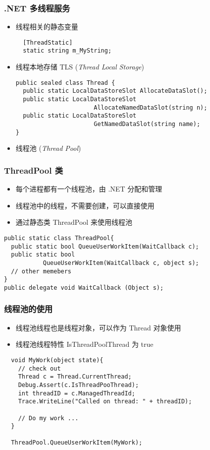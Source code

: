 \begin{frame}[fragile]
\frametitle{.NET 多线程服务}
\begin{itemize}
\item 线程相关的静态变量
\begin{lstlisting}
  [ThreadStatic]
  static string m_MyString;
\end{lstlisting}
\item 线程本地存储 TLS (\textit{Thread Local Storage})
\begin{lstlisting}
public sealed class Thread {
  public static LocalDataStoreSlot AllocateDataSlot();
  public static LocalDataStoreSlot 
                      AllocateNamedDataSlot(string n);
  public static LocalDataStoreSlot
                      GetNamedDataSlot(string name);
}
\end{lstlisting}
\item 线程池 (\textit{Thread Pool})
\end{itemize}
\end{frame}

\begin{frame}[fragile]
\frametitle{ThreadPool 类}
\begin{itemize}
\item 每个进程都有一个线程池，由 .NET 分配和管理
\item 线程池中的线程，不需要创建，可以直接使用
\item 通过静态类 ThreadPool 来使用线程池
\end{itemize}
\begin{lstlisting}
public static class ThreadPool{
  public static bool QueueUserWorkItem(WaitCallback c);
  public static bool
           QueueUserWorkItem(WaitCallback c, object s);
  // other memebers
}
public delegate void WaitCallback (Object s);
\end{lstlisting}
\end{frame}

\begin{frame}[fragile]
\frametitle{线程池的使用}
\begin{itemize}
\item 线程池线程也是线程对象，可以作为 Thread 对象使用
\item 线程池线程特性 IsThreadPoolThread 为 true
\end{itemize}
\begin{lstlisting}
  void MyWork(object state){
    // check out
    Thread c = Thread.CurrentThread;
    Debug.Assert(c.IsThreadPooThread);
    int threadID = c.ManagedThreadId;
    Trace.WriteLine("Called on thread: " + threadID);

    // Do my work ...
  }

  ThreadPool.QueueUserWorkItem(MyWork);
\end{lstlisting}
\end{frame}


